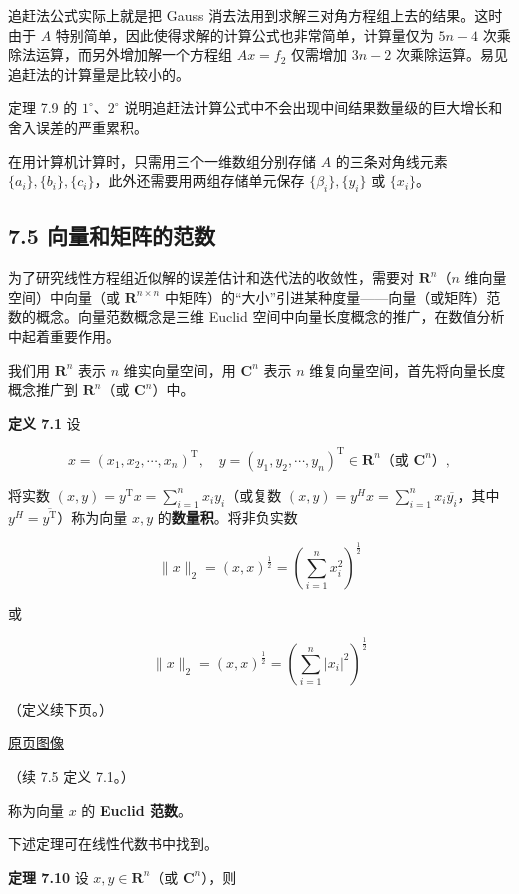 \documentclass[
  10pt,
  fontset=fandol]{ctexart}
\begin{document}
追赶法公式实际上就是把 Gauss 消去法用到求解三对角方程组上去的结果。这时由于 \(A\) 特别简单，因此使得求解的计算公式也非常简单，计算量仅为 \(5n-4\) 次乘除法运算，而另外增加解一个方程组 \(Ax=f_2\) 仅需增加 \(3n-2\) 次乘除运算。易见追赶法的计算量是比较小的。

定理 7.9 的 \(1^\circ\)、\(2^\circ\) 说明追赶法计算公式中不会出现中间结果数量级的巨大增长和舍入误差的严重累积。

在用计算机计算时，只需用三个一维数组分别存储 \(A\) 的三条对角线元素 \(\{a_i\},\{b_i\},\{c_i\}\)，此外还需要用两组存储单元保存 \(\{\beta_i\},\{y_i\}\) 或 \(\{x_i\}\)。

\subsection{7.5 向量和矩阵的范数}\label{ux5411ux91cfux548cux77e9ux9635ux7684ux8303ux6570}

为了研究线性方程组近似解的误差估计和迭代法的收敛性，需要对 \(\mathbf R^n\)（\(n\) 维向量空间）中向量（或 \(\mathbf R^{n\times n}\) 中矩阵）的``大小''引进某种度量------向量（或矩阵）范数的概念。向量范数概念是三维 Euclid 空间中向量长度概念的推广，在数值分析中起着重要作用。

我们用 \(\mathbf R^n\) 表示 \(n\) 维实向量空间，用 \(\mathbf C^n\) 表示 \(n\) 维复向量空间，首先将向量长度概念推广到 \(\mathbf R^n\)（或 \(\mathbf C^n\)）中。

\textbf{定义 7.1} 设

\[
x=(x_1,x_2,\cdots,x_n)^{\mathrm T},\quad y=(y_1,y_2,\cdots,y_n)^{\mathrm T}\in\mathbf R^n\text{（或 }\mathbf C^n\text{）},
\]

将实数 \((x,y)=y^{\mathrm T}x=\sum_{i=1}^{n}x_iy_i\)（或复数 \((x,y)=y^Hx=\sum_{i=1}^{n}x_i\overline{y_i}\)，其中 \(y^H=\overline{y^{\mathrm T}}\)）称为向量 \(x,y\) 的\textbf{数量积}。将非负实数

\[
\|x\|_2=(x,x)^{\frac12}=\left(\sum_{i=1}^{n}x_i^2\right)^{\frac12}
\]

或

\[
\|x\|_2=(x,x)^{\frac12}=\left(\sum_{i=1}^{n}|x_i|^2\right)^{\frac12}
\]

（定义续下页。）

\href{../../source-images/pdf-200.jpeg}{原页图像}

（续 7.5 定义 7.1。）

称为向量 \(x\) 的 \textbf{Euclid 范数}。

下述定理可在线性代数书中找到。

\textbf{定理 7.10} 设 \(x,y\in\mathbf R^n\)（或 \(\mathbf C^n\)），则
\end{document}
